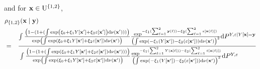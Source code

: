 and for  $\mathbf{x}\in\mathrm{U}^{\{1,2\}}$, 
\begin{eqnarray*}
\lefteqn{\densityratio_{\{1,2\}}(\position\mid\signal)}\\&=&\frac{
\int 
\frac{\left(1-(1+(\int\exp\left( \paramnuisance_0+\paramnuisance_1\Signal[\position']+\paramnuisance_2\varepsilon[\position']\right)\derive\dominantU(\position')))\right)}{\exp\left(\int\exp\left( \paramnuisance_0+\paramnuisance_1\Signal[\position']+\paramnuisance_2\varepsilon[\position']\right)\derive\dominantU(\position')\right)}\frac{
\exp^{-\paramnuisance_1(\sum_{\ell=1}^2\signal(\ell))-\paramnuisance_2(\sum_{\ell=1}^2\varepsilon[\position(\ell)])}}{
\left(\int \exp\left(-\paramnuisance_1(\Signal[\position'])-\paramnuisance_2(\varepsilon[\position'])\right)\derive\nu(\position')\right)^2
}\derive P^{\Signal,\varepsilon\mid \Signal[\position]=\signal} 
}{
\int 
\frac{\left(1-(1+(\int\exp\left( \paramnuisance_0+\paramnuisance_1\Signal[\position']+\paramnuisance_2\varepsilon[\position']\right)\derive\dominantU(\position')))\right)}{\exp\left(\int \exp\left(\paramnuisance_0+\paramnuisance_1\Signal[\position']+\paramnuisance_2\varepsilon[\position']\right)\derive\dominantU(\position')\right)}\frac{
\exp^{-\paramnuisance_1(\sum_{\ell=1}^2\Signal(\position[\ell]))-\paramnuisance_2(\sum_{\ell=1}^2\varepsilon[\position(\ell)])}}{
\left(\int \exp\left(-\paramnuisance_1(\Signal[\position'])-\paramnuisance_2(\varepsilon[\position'])\right)\derive\nu(\position')\right)^2
}\derive P^{\Signal,\varepsilon}\phantom{11111} 
}
\end{eqnarray*}

